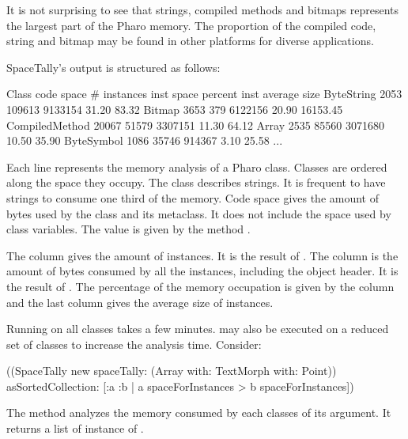 \documentclass[a4paper,10pt,twoside]{book}
\begin{document}
It is not surprising to see that strings, compiled methods and bitmaps represents the largest part of the Pharo memory. The proportion of the compiled code, string and bitmap may be found in other platforms for diverse applications.

SpaceTally's output is structured as follows:

\begin{code}{}
Class                            code space # instances  inst space     percent   inst average size
ByteString                           2053      109613        9133154       31.20               83.32
Bitmap                                 3653            379       6122156       20.90          16153.45
CompiledMethod                 20067      51579       3307151       11.30                64.12
Array                                   2535         85560       3071680      10.50                 35.90
ByteSymbol                        1086         35746         914367        3.10                 25.58
...
\end{code}

Each line represents the memory analysis of a Pharo class. Classes are ordered along the space they occupy. The class  describes strings. It is frequent to have strings to consume one third of the memory.
Code space gives the amount of bytes used by the class and its metaclass. It does not include the space used by class variables. The value is given by the method . 

The  column gives the amount of instances. It is the result of . 
The  column is the amount of bytes consumed by all the instances, including the object header. It is the result of .
The percentage of the memory occupation is given by the column  and the last column gives the average size of instances.

Running  on all classes takes a few minutes.  may also be executed on a reduced set of classes to increase the analysis time. Consider:


\begin{code}{}
((SpaceTally new spaceTally: (Array with: TextMorph with: Point)) 
	asSortedCollection: [:a :b | a spaceForInstances > b spaceForInstances]) 
\end{code}

The method  analyzes the memory consumed by each classes of its argument. It returns a list of instance of .
\end{document}
